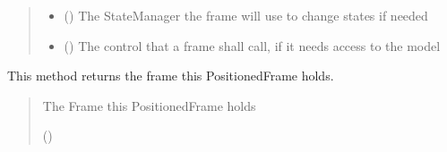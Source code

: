 \documentclass[letterpaper,10pt,english]{sphinxmanual}
\begin{document}
\begin{fulllineitems}
\begin{fulllineitems}
\begin{quote}
\begin{description}
\begin{itemize}
\item {} 
\sphinxAtStartPar
{} ({\hyperref[\detokenize{apidoc/src.osm_configurator.view.states:src.osm_configurator.view.states.state_manager.StateManager}]{}}) \textendash{} The StateManager the frame will use to change states if needed

\item {} 
\sphinxAtStartPar
{} ({\hyperref[\detokenize{apidoc/src.osm_configurator.control:src.osm_configurator.control.control_interface.IControl}]{}}) \textendash{} The control that a frame shall call, if it needs access to the model

\end{itemize}

\end{description}\end{quote}

\end{fulllineitems}


\begin{fulllineitems}
\label{\detokenize{apidoc/src.osm_configurator.view.states:src.osm_configurator.view.states.positioned_frame.PositionedFrame.get_frame}}
\pysigstartsignatures
{}
\pysigstopsignatures
\sphinxAtStartPar
This method returns the frame this PositionedFrame holds.
\begin{quote}\begin{description}
\sphinxAtStartPar
The Frame this PositionedFrame holds

\sphinxAtStartPar
({\hyperref[\detokenize{apidoc/src.osm_configurator.view.toplevelframes:src.osm_configurator.view.toplevelframes.top_level_frame.TopLevelFrame}]{}})

\end{description}\end{quote}

\end{fulllineitems}



\end{fulllineitems}
\end{document}
